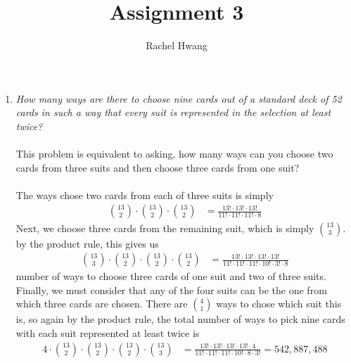 \documentclass[12pt]{article}
\title{Assignment 3}
\author{Rachel Hwang}
\begin{document}
\maketitle

\begin{enumerate}
\item \emph{How many ways are there to choose nine cards out of a standard deck of 52 cards in such a way that every suit is represented in the selection at least twice?} \\
\\
This problem is equivalent to asking, how many ways can you choose two cards from three suits and then choose three cards from one suit? \\
\\
The ways chose two cards from each of three suits is simply
\begin{align}
\nonumber \binom{13}{2} \cdot \binom{13}{2} \cdot \binom{13}{2} &= \frac{13!\cdot 13!\cdot 13!}{11! \cdot 11! \cdot 11! \cdot 8}
\end{align}
Next, we choose three cards from the remaining suit, which is simply $\binom{13}{3}$. by the product rule, this gives us
\begin{align}
\nonumber\binom{13}{3} \cdot \binom{13}{2} \cdot \binom{13}{2} \cdot \binom{13}{2} &= \frac{13!\cdot 13!\cdot 13!\cdot 13!}{11! \cdot 11! \cdot 11! \cdot 10!\cdot 3! \cdot 8}
\end{align}
number of ways to choose three cards of one suit and two of three suits. Finally, we must consider that any of the four suits can be the one from which three cards are chosen. There are $\binom{4}{1}$ ways to chose which suit this is, so again by the product rule, the total number of ways to pick nine cards with each suit represented at least twice is
\begin{align}
\nonumber 4 \cdot \binom{13}{2} \cdot \binom{13}{2} \cdot \binom{13}{2} \cdot \binom{13}{3} &= \frac{13!\cdot 13! \cdot 13! \cdot 13! \cdot 4}{11!\cdot 11!\cdot 11!\cdot 10! \cdot 8 \cdot 3!} = 542,887,488
\end{align}
\\


\end{enumerate}
\end{document}
